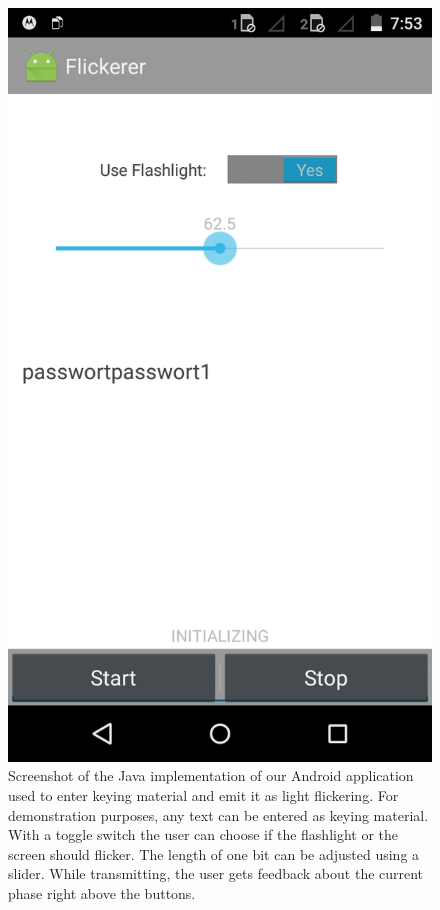 \documentclass{ewsn-proc} %
\begin{document}
\begin{figure}
	\centering
	\includegraphics[scale=.15]{images/screen_native.png}
	\caption{Screenshot of the Java implementation of our Android application used to enter keying material and emit it as light flickering. For demonstration purposes, any text can be entered as keying material. With a toggle switch the user can choose if the flashlight or the screen should flicker. The length of one bit can be adjusted using a slider. While transmitting, the user gets feedback about the current phase right above the buttons.}
	\label{fig:screenshot}
\end{figure}
\end{document}
